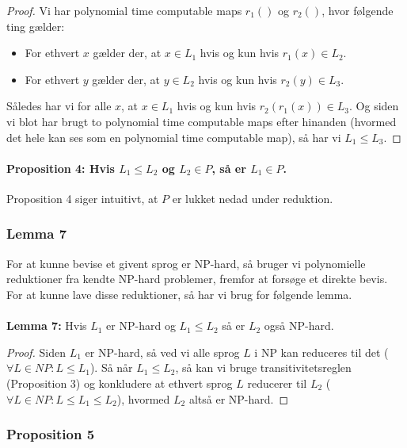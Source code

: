 \begin{proof}
 Vi har polynomial time computable maps $r_1()$ og $r_2()$, hvor følgende ting gælder:

\begin{itemize}
 \item For ethvert $x$ gælder der, at $x \in L_1$ hvis og kun hvis $r_1(x) \in L_2$.
 \item For ethvert $y$ gælder der, at $y \in L_2$ hvis og kun hvis $r_2(y) \in L_3$.
\end{itemize}

Således har vi for alle $x$, at $x \in L_1$ hvis og kun hvis $r_2(r_1(x)) \in L_3$. Og siden vi blot har brugt to polynomial time computable maps efter hinanden (hvormed det hele kan ses som en polynomial time computable map), så har vi $L_1 \leq L_3$.
\end{proof}

\paragraph{Proposition 4: Hvis $L_1 \leq L_2$ og $L_2 \in P$, så er $L_1 \in P$.}

Proposition 4 siger intuitivt, at $P$ er lukket nedad under reduktion. 


\subsubsection{Lemma 7}

For at kunne bevise et givent sprog er NP-hard, så bruger vi  polynomielle reduktioner fra kendte NP-hard problemer, fremfor at forsøge et direkte bevis. For at kunne lave disse reduktioner, så har vi brug for følgende lemma.\\
~\\
\textbf{Lemma 7:} Hvis $L_1$ er NP-hard og $L_1 \leq L_2$ så er $L_2$ også NP-hard.

\begin{proof}
 Siden $L_1$ er NP-hard, så ved vi alle sprog $L$ i NP kan reduceres til det ($\forall L \in NP: L \leq L_1$). Så når $L_1 \leq L_2$, så kan vi bruge transitivitetsreglen (Proposition 3) og konkludere at ethvert sprog $L$ reducerer til $L_2$ ($\forall L \in NP: L \leq L_1 \leq L_2$), hvormed $L_2$ altså er NP-hard.
\end{proof}


\subsubsection{Proposition 5}

